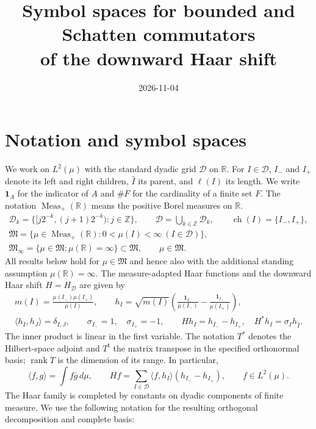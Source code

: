 \documentclass[11pt]{amsart}
\title{Symbol spaces for bounded and Schatten commutators\\of the downward Haar shift}
\date{2026-11-04}
\newcommand{\D}{\mathcal D}
\newcommand{\ip}[2]{\langle #1,#2\rangle}
\newcommand{\ch}{\operatorname{ch}}
\newcommand{\rank}{\operatorname{rank}}
\begin{document}
\maketitle

\section{Notation and symbol spaces}
We work on $L^2(\mu)$ with the standard dyadic grid $\D$ on
$\mathbb R$. For $I\in\D$, $I_-$ and $I_+$ denote its left and right
children, $\widehat I$ its parent, and $\ell(I)$ its length. We write
$\mathbf1_A$ for the indicator of $A$ and $\#F$ for the cardinality of
a finite set $F$. The notation $\operatorname{Meas}_+(\mathbb R)$ means
the positive Borel measures on $\mathbb R$.
\begin{gather*}
 \D_k=\{[j2^{-k},(j+1)2^{-k}):j\in\mathbb Z\},\qquad
 \D=\bigcup_{k\in\mathbb Z}\D_k,\qquad
 \ch(I)=\{I_-,I_+\},\\
 \mathfrak M=\{\mu\in\operatorname{Meas}_+(\mathbb R):
                   0<\mu(I)<\infty\ (I\in\D)\},\\
 \mathfrak M_\infty=\{\mu\in\mathfrak M:\mu(\mathbb R)=\infty\}
                  \subset\mathfrak M,\qquad \mu\in\mathfrak M.
\end{gather*}
All results below hold for $\mu\in\mathfrak M$ and hence also with
the additional standing assumption $\mu(\mathbb R)=\infty$.
The measure-adapted Haar functions and the downward Haar shift
$H=H_{\D}$ are given by
\begin{gather*}
 m(I)=\frac{\mu(I_-)\mu(I_+)}{\mu(I)},\qquad
 h_I=\sqrt{m(I)}\left(\frac{\mathbf1_{I_-}}{\mu(I_-)}
                     -\frac{\mathbf1_{I_+}}{\mu(I_+)}\right),\\
 \ip{h_I}{h_J}=\delta_{I,J},\qquad
 \sigma_{I_-}=1,\quad\sigma_{I_+}=-1,\qquad
 Hh_I=h_{I_-}-h_{I_+},\quad H^*h_I=\sigma_Ih_{\widehat I}.
\end{gather*}
The inner product is linear in the first variable. The notation
$T^*$ denotes the Hilbert-space adjoint and $T^{\mathsf t}$ the
matrix transpose in the specified orthonormal basis; $\rank T$ is
the dimension of its range. In particular,
\[
 \ip{f}{g}=\int f\overline g\,d\mu,\qquad
 Hf=\sum_{I\in\D}\ip{f}{h_I}(h_{I_-}-h_{I_+}),\qquad f\in L^2(\mu).
\]
The Haar family is completed by constants on dyadic components of
finite measure. We use the following notation for the resulting
orthogonal decomposition and complete basis:
\end{document}

